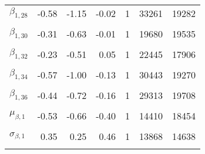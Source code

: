 \begin{longtable}[t]{lrrrrrr}
$\beta_{1, 28}$ & -0.58 & -1.15 & -0.02 & 1 & 33261 & 19282\\
\cellcolor{gray!6}{$\beta_{1, 29}$} & \cellcolor{gray!6}{-0.57} & \cellcolor{gray!6}{-0.80} & \cellcolor{gray!6}{-0.33} & \cellcolor{gray!6}{1} & \cellcolor{gray!6}{21516} & \cellcolor{gray!6}{17923}\\
$\beta_{1, 30}$ & -0.31 & -0.63 & -0.01 & 1 & 19680 & 19535\\
\cellcolor{gray!6}{$\beta_{1, 31}$} & \cellcolor{gray!6}{-0.86} & \cellcolor{gray!6}{-1.20} & \cellcolor{gray!6}{-0.51} & \cellcolor{gray!6}{1} & \cellcolor{gray!6}{20872} & \cellcolor{gray!6}{17547}\\
$\beta_{1, 32}$ & -0.23 & -0.51 & 0.05 & 1 & 22445 & 17906\\
\cellcolor{gray!6}{$\beta_{1, 33}$} & \cellcolor{gray!6}{-0.08} & \cellcolor{gray!6}{-0.44} & \cellcolor{gray!6}{0.29} & \cellcolor{gray!6}{1} & \cellcolor{gray!6}{12460} & \cellcolor{gray!6}{15855}\\
$\beta_{1, 34}$ & -0.57 & -1.00 & -0.13 & 1 & 30443 & 19270\\
\cellcolor{gray!6}{$\beta_{1, 35}$} & \cellcolor{gray!6}{-0.19} & \cellcolor{gray!6}{-0.50} & \cellcolor{gray!6}{0.11} & \cellcolor{gray!6}{1} & \cellcolor{gray!6}{19888} & \cellcolor{gray!6}{17643}\\
$\beta_{1, 36}$ & -0.44 & -0.72 & -0.16 & 1 & 29313 & 19708\\
\cellcolor{gray!6}{$\mu_{\beta, 0}$} & \cellcolor{gray!6}{0.89} & \cellcolor{gray!6}{0.84} & \cellcolor{gray!6}{0.95} & \cellcolor{gray!6}{1} & \cellcolor{gray!6}{10765} & \cellcolor{gray!6}{16101}\\
$\mu_{\beta, 1}$ & -0.53 & -0.66 & -0.40 & 1 & 14410 & 18454\\
\cellcolor{gray!6}{$\sigma_{\beta, 0}$} & \cellcolor{gray!6}{0.13} & \cellcolor{gray!6}{0.07} & \cellcolor{gray!6}{0.19} & \cellcolor{gray!6}{1} & \cellcolor{gray!6}{4777} & \cellcolor{gray!6}{5979}\\
$\sigma_{\beta, 1}$ & 0.35 & 0.25 & 0.46 & 1 & 13868 & 14638\\
\cellcolor{gray!6}{$\sigma_{y}$} & \cellcolor{gray!6}{0.16} & \cellcolor{gray!6}{0.14} & \cellcolor{gray!6}{0.18} & \cellcolor{gray!6}{1} & \cellcolor{gray!6}{15022} & \cellcolor{gray!6}{19497}\\*
\end{longtable}